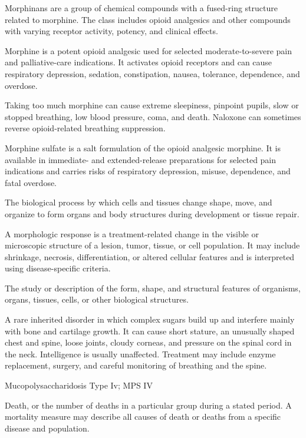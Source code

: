  Morphinans are a group of chemical compounds with a fused-ring structure related to morphine. The class includes opioid analgesics and other compounds with varying receptor activity, potency, and clinical effects.

 Morphine is a potent opioid analgesic used for selected moderate-to-severe pain and palliative-care indications. It activates opioid receptors and can cause respiratory depression, sedation, constipation, nausea, tolerance, dependence, and overdose.

 Taking too much morphine can cause extreme sleepiness, pinpoint pupils, slow or stopped breathing, low blood pressure, coma, and death. Naloxone can sometimes reverse opioid-related breathing suppression.

 Morphine sulfate is a salt formulation of the opioid analgesic morphine. It is available in immediate- and extended-release preparations for selected pain indications and carries risks of respiratory depression, misuse, dependence, and fatal overdose.

 The biological process by which cells and tissues change shape, move, and organize to form organs and body structures during development or tissue repair.

 A morphologic response is a treatment-related change in the visible or microscopic structure of a lesion, tumor, tissue, or cell population. It may include shrinkage, necrosis, differentiation, or altered cellular features and is interpreted using disease-specific criteria.

 The study or description of the form, shape, and structural features of organisms, organs, tissues, cells, or other biological structures.

 A rare inherited disorder in which complex sugars build up and interfere mainly with bone and cartilage growth. It can cause short stature, an unusually shaped chest and spine, loose joints, cloudy corneas, and pressure on the spinal cord in the neck. Intelligence is usually unaffected. Treatment may include enzyme replacement, surgery, and careful monitoring of breathing and the spine.

\synonyms
Mucopolysaccharidosis Type Iv; MPS IV

 Death, or the number of deaths in a particular group during a stated period. A mortality measure may describe all causes of death or deaths from a specific disease and population.

